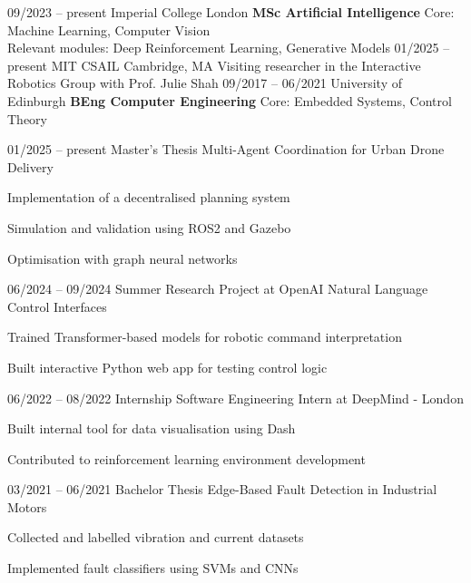 \documentclass{cv}
\begin{document}
\addPhoto
\addDate

\sectionEnd

    \entryParagraph
        {09/2023 -- present}
        {Imperial College London}
        {\textbf{MSc Artificial Intelligence}}
        {
            Core: Machine Learning, Computer Vision \\ 
            Relevant modules: Deep Reinforcement Learning, Generative Models
        }
    \entryParagraph
        {01/2025 -- present}
        {MIT CSAIL}
        {Cambridge, MA}
        {
            Visiting researcher in the Interactive Robotics Group with Prof. Julie Shah
        }
    \entryParagraph
        {09/2017 -- 06/2021}
        {University of Edinburgh}
        {\textbf{BEng Computer Engineering}}
        {
            Core: Embedded Systems, Control Theory
        }
\sectionEnd

    \entryList
        {01/2025 -- present}
        {Master’s Thesis}
        {Multi-Agent Coordination for Urban Drone Delivery}
        {
            \item{Implementation of a decentralised planning system}
            \item{Simulation and validation using ROS2 and Gazebo}
            \item{Optimisation with graph neural networks}
        }
    \entryList
        {06/2024 -- 09/2024}
        {Summer Research Project at OpenAI}
        {Natural Language Control Interfaces}
        {
            \item{Trained Transformer-based models for robotic command interpretation}
            \item{Built interactive Python web app for testing control logic}
        }
    \entryList
        {06/2022 -- 08/2022}
        {Internship}
        {Software Engineering Intern at DeepMind - London}
        {
            \item{Built internal tool for data visualisation using Dash}
            \item{Contributed to reinforcement learning environment development}
        }
    \entryList
        {03/2021 -- 06/2021}
        {Bachelor Thesis}
        {Edge-Based Fault Detection in Industrial Motors}
        {
            \item{Collected and labelled vibration and current datasets}
            \item{Implemented fault classifiers using SVMs and CNNs}
        }
\sectionEnd
\end{document}
